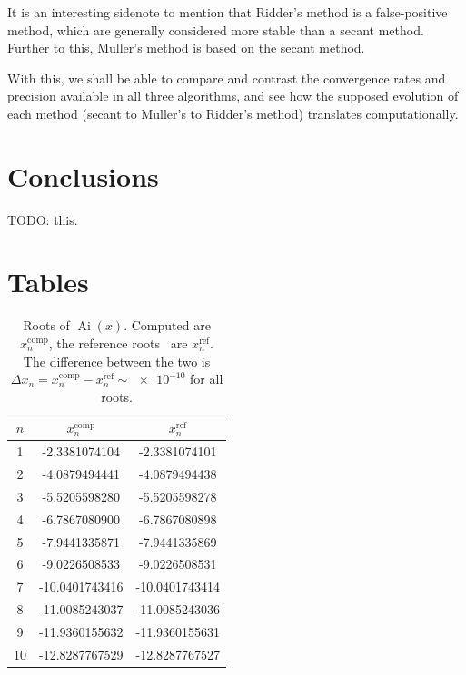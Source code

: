 \documentclass[]{article}
\newcommand{\Ai}[1]{\ensuremath{\operatorname{Ai}({#1})}}
\begin{document}
It is an interesting sidenote to mention that Ridder's method is a false-positive method, which are generally considered more stable than a secant method. Further to this, Muller's method is based on the secant method.

With this, we shall be able to compare and contrast the convergence rates and precision available in all three algorithms, and see how the supposed evolution of each method (secant to Muller's to Ridder's method) translates computationally.

\section{Conclusions}

TODO: this.

\section{Tables}

\begin{table}[H]
	\begin{center}
		\begin{tabular}{ c c c }
			$n$ & $x_{n}^{\mathrm{comp}}$ & $x_{n}^{\mathrm{ref}}$\\
			\hline
			1  & -2.3381074104  & -2.3381074101 \\
			2  & -4.0879494441  & -4.0879494438 \\
			3  & -5.5205598280  & -5.5205598278 \\
			4  & -6.7867080900  & -6.7867080898 \\
			5  & -7.9441335871  & -7.9441335869 \\
			6  & -9.0226508533  & -9.0226508531 \\
			7  & -10.0401743416 & -10.0401743414\\
			8  & -11.0085243037 & -11.0085243036\\
			9  & -11.9360155632 & -11.9360155631\\
			10 & -12.8287767529 & -12.8287767527
		\end{tabular}
		\caption{Roots of \Ai{x}. Computed are $x_{n}^{\mathrm{comp}}$, the reference roots~\cite{ref:abramowitz} are $x_{n}^{\mathrm{ref}}$. The difference between the two is $\Delta x_{n} = x_{n}^{\mathrm{comp}} - x_{n}^{\mathrm{ref}} \sim \num{e-10}$ for all roots.}
		\label{tab:roots}
	\end{center}
\end{table}
\end{document}
